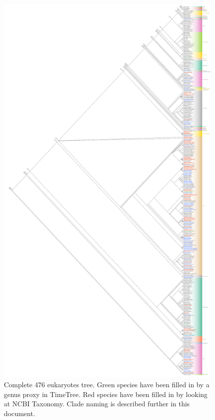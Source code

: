\begin{figure}
\centering
\includegraphics[width=\textwidth,height=0.95\textheight]{../data-raw/tree_hybrid.pdf}
\caption{Complete 476 eukaryotes tree. Green species have been filled in
by a genus proxy in TimeTree. Red species have been filled in by looking
at NCBI Taxonomy. Clade naming is described further in this document.}
\end{figure}
